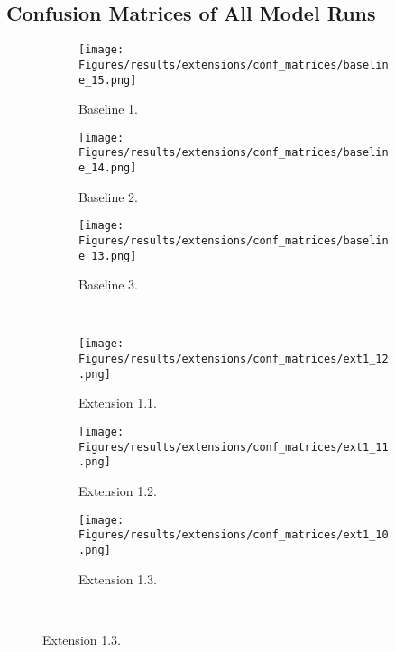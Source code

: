 \clearpage

\subsection{Confusion Matrices of All Model Runs}
\label{app:conf_matrices}
    
\begin{figure}[!htb]
    \centering
    \begin{adjustbox}{center}
        \begin{subfigure}{.43\textwidth}
            \centering
            \texttt{[image: Figures/results/extensions/conf\_matrices/baseline\_15.png]}
            \caption{Baseline 1.}
        \end{subfigure}
        \begin{subfigure}{.355\textwidth}
            \centering
            \texttt{[image: Figures/results/extensions/conf\_matrices/baseline\_14.png]}
            \caption{Baseline 2.}
        \end{subfigure}
        \begin{subfigure}{.355\textwidth}
            \centering
            \texttt{[image: Figures/results/extensions/conf\_matrices/baseline\_13.png]}
            \caption{Baseline 3.}
        \end{subfigure}
    \end{adjustbox}
    \\[0.66cm]
    \begin{adjustbox}{center}
        \begin{subfigure}{.43\textwidth}
            \centering
            \texttt{[image: Figures/results/extensions/conf\_matrices/ext1\_12.png]}
            \caption{Extension 1.1.}
        \end{subfigure}
        \begin{subfigure}{.355\textwidth}
            \centering
            \texttt{[image: Figures/results/extensions/conf\_matrices/ext1\_11.png]}
            \caption{Extension 1.2.}
        \end{subfigure}
        \begin{subfigure}{.355\textwidth}
            \centering
            \texttt{[image: Figures/results/extensions/conf\_matrices/ext1\_10.png]}
            \caption{Extension 1.3.}
        \end{subfigure}
    \end{adjustbox}
    \\[0.66cm]

\end{figure}

